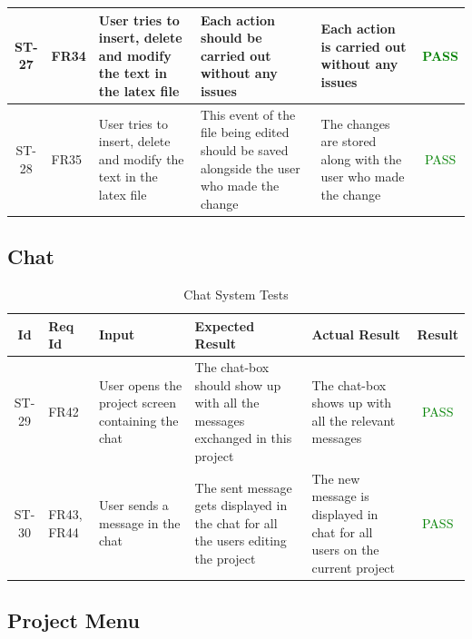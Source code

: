 \documentclass[12pt, titlepage]{article}
\begin{document}
\begin{center}
\begin{longtable}{|c|p{1cm}|p{2.7cm}|p{3cm}|p{3cm}|c|}
			\hline
			ST-27 & FR34 & User tries to insert, delete and modify the text in the latex file & Each action should be carried out without any issues & Each action is carried out without any issues & \textcolor{green}{PASS} \\
			\hline
			ST-28 & FR35 & User tries to insert, delete and modify the text in the latex file & This event of the file being edited should be saved alongside the user who made the change & The changes are stored along with the user who made the change & \textcolor{green}{PASS} \\
			\hline
		\end{longtable}
	\end{center}
	
	\subsection{Chat}
	
	\begin{center}
		\begin{longtable}{|c|p{1cm}|p{2.7cm}|p{3cm}|p{3cm}|c|}
			\caption{Chat System Tests \label{long}}\\
			\hline
			\textbf{Id} & \textbf{Req Id} & \textbf{Input} & \textbf{Expected Result} & \textbf{Actual Result} & \textbf{Result}   \\
			\hline
			ST-29 & FR42 & User opens the project screen containing the chat & The chat-box should show up with all the messages exchanged in this project & The chat-box shows up with all the relevant messages &  \textcolor{green}{PASS} \\
			\hline
			ST-30 & FR43, FR44 & User sends a message in the chat & The sent message gets displayed in the chat for all the users editing the project & The new message is displayed in chat for all users on the current project &  \textcolor{green}{PASS} \\
			\hline
		\end{longtable}
	\end{center}
	
	\subsection{Project Menu}
	
\end{document}
